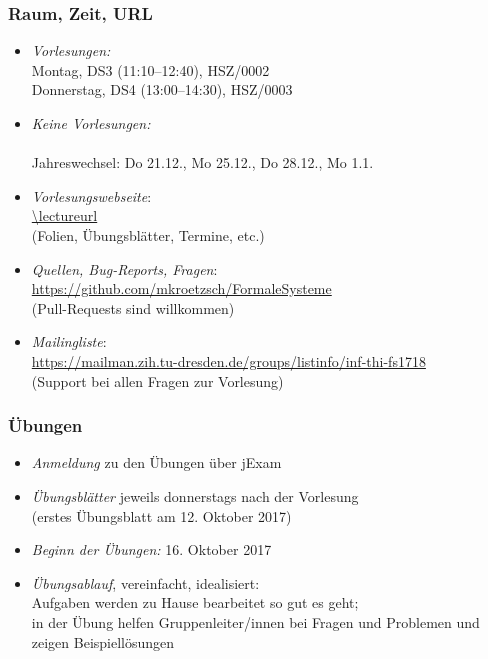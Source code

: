 \documentclass[onlymath]{beamer}
\begin{document}
\maketitle



% 
% 

\begin{frame}\frametitle{Raum, Zeit, URL}

\begin{itemize}
\item \emph{Vorlesungen:}\\
	Montag, DS3 (11:10--12:40), HSZ/0002\\
	Donnerstag, DS4 (13:00--14:30), HSZ/0003
\item \emph{Keine Vorlesungen:}\\
	\\
	Jahreswechsel: Do 21.12., Mo 25.12., Do 28.12., Mo 1.1.
\item \emph{Vorlesungswebseite}:\\[.5ex]
	\url{\lectureurl}\\[0.5ex]
	{\footnotesize(Folien, Übungsblätter, Termine, etc.)}
\item \emph{Quellen, Bug-Reports, Fragen}:\\[.5ex]
	\url{https://github.com/mkroetzsch/FormaleSysteme}\\[.5ex]
	{\footnotesize(Pull-Requests sind willkommen)}
\item \emph{Mailingliste}:\\[0.5ex]
\footnotesize
	\url{https://mailman.zih.tu-dresden.de/groups/listinfo/inf-thi-fs1718}\\[0.5ex]
	{\footnotesize(Support bei allen Fragen zur Vorlesung)}
\end{itemize}

\end{frame}


\begin{frame}\frametitle{Übungen}
\begin{itemize}
\item \emph{Anmeldung} zu den Übungen über jExam
\item \emph{Übungsblätter} jeweils donnerstags nach der Vorlesung\\
	(erstes Übungsblatt am 12. Oktober 2017)
\item \emph{Beginn der Übungen:} 16. Oktober 2017
\item \emph{Übungsablauf}, vereinfacht, idealisiert:\\
	Aufgaben werden zu Hause bearbeitet so gut es geht;\\
	in der Übung helfen Gruppenleiter/innen bei Fragen und Problemen und zeigen Beispiellösungen\\[1ex]
\end{itemize}

\end{frame}
\end{document}
